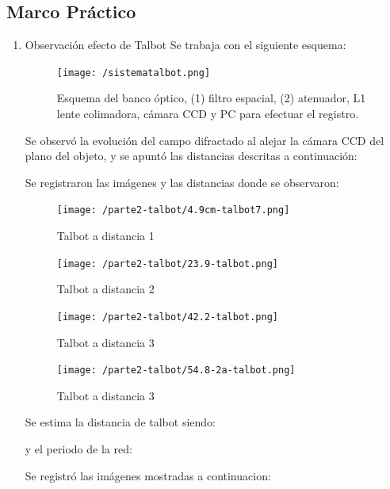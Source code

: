 \documentclass{./packages/optica-article}
\begin{document}
\subsection{Marco Práctico}
    \begin{enumerate}
    \item Observación efecto de Talbot
Se trabaja con el siguiente esquema:

    \begin{figure}[h]
    \centering
    \texttt{[image: /sistematalbot.png]}
    \caption{ Esquema del banco óptico, (1) filtro espacial, (2) atenuador, L1 lente colimadora, cámara CCD y PC para efectuar el registro.}
    \label{talbot}
    \end{figure}
    
    
Se observó la evolución del campo difractado al alejar la cámara CCD del plano del objeto, y se apuntó las distancias descritas a continuación:\par


Se registraron las imágenes y las distancias donde se observaron:\par
    \begin{figure}[h]
    \centering
    \texttt{[image: /parte2-talbot/4.9cm-talbot7.png]}
    \caption{ Talbot a distancia 1}
    \label{talbot1}
    \end{figure}
    
    \begin{figure}[h]
    \centering
    \texttt{[image: /parte2-talbot/23.9-talbot.png]}
    \caption{ Talbot a distancia 2}
    \label{talbot2}
    \end{figure}
    
    \begin{figure}[h]
    \centering
    \texttt{[image: /parte2-talbot/42.2-talbot.png]}
    \caption{ Talbot a distancia 3}
    \label{talbot3}
    \end{figure}
    
    \begin{figure}[h]
    \centering
    \texttt{[image: /parte2-talbot/54.8-2a-talbot.png]}
    \caption{ Talbot a distancia 3}
    \label{talbot3}
    \end{figure}
    

Se estima la distancia de talbot siendo:
\par

y el periodo de la red: \par


Se registró las imágenes mostradas a continuacion:


\end{enumerate}
\end{document}
